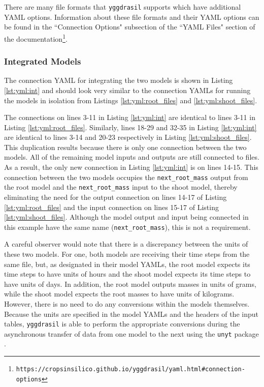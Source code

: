 \documentclass[journal]{IEEEtran}
\newcommand{\pkg}{{\tt yggdrasil}{}}
\newcommand{\pkglink}{yggdrasil}
\newcommand{\intyml}{}
\begin{document}
There are many file formats that {\pkg} supports which have additional YAML options.
Information about these file formats and their YAML options can be found in the ``Connection Options" subsection of the ``YAML Files" section of the documentation\footnote{{\tt https://cropsinsilico.github.io/\pkglink/yaml.html\#connection-options}}.

\subsubsection{Integrated Models}
%
The connection YAML for integrating the two models is shown in Listing \ref{lst:yml:int} and should look very similar to the connection YAMLs for running the models in isolation from Listings \ref{lst:yml:root_files} and \ref{lst:yml:shoot_files}. 
%
\intyml
%
The connections on lines 3-11 in Listing \ref{lst:yml:int} are identical to lines 3-11 in Listing \ref{lst:yml:root_files}. Similarly, lines 18-29 and 32-35 in Listing \ref{lst:yml:int} are identical to lines 3-14 and 20-23 respectively in Listing \ref{lst:yml:shoot_files}. This duplication results because there is only one connection between the two models. All of the remaining model inputs and outputs are still connected to files. As a result, the only new connection in Listing \ref{lst:yml:int} is on lines 14-15. This connection between the two models occupies the {\tt next\_root\_mass} output from the root model and the {\tt next\_root\_mass} input to the shoot model, thereby eliminating the need for the output connection on lines 14-17 of Listing \ref{lst:yml:root_files} and the input connection on lines 15-17 of Listing \ref{lst:yml:shoot_files}. Although the model output and input being connected in this example have the same name ({\tt next\_root\_mass}), this is not a requirement.

A careful observer would note that there is a discrepancy between the units of these two models. For one, both models are receiving their time steps from the same file, but, as designated in their model YAMLs, the root model expects its time steps to have units of hours and the shoot model expects its time steps to have units of days. In addition, the root model outputs masses in units of grams, while the shoot model expects the root masses to have units of kilograms. However, there is no need to do any conversions within the models themselves. Because the units are specified in the model YAMLs and the headers of the input tables, {\pkg} is able to perform the appropriate conversions during the asynchronous transfer of data from one model to the next using the {\tt unyt} package \citep{Goldbaum2018}. 
\end{document}
